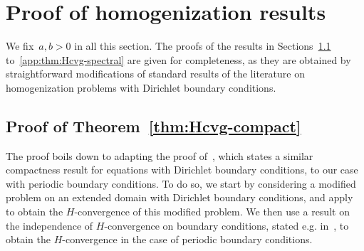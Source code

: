 \documentclass{article}
\begin{document}
\section{Proof of homogenization results}

We fix~$a,b>0$ in all this section. The proofs of the results in Sections~\ref{app:thm:Hcvg-compact} to~\ref{app:thm:Hcvg-spectral} are given for completeness, as they are obtained by straightforward modifications of standard results of the literature on homogenization problems with Dirichlet boundary conditions.

\subsection{Proof of Theorem~\ref{thm:Hcvg-compact}}
\label{app:thm:Hcvg-compact}

The proof boils down to adapting the proof of~\cite[Theorem~1.2.16]{allaire_homogeneisation}, which states a similar compactness result for equations with Dirichlet boundary conditions, to our case with periodic boundary conditions. To do so, we start by considering a modified problem on an extended domain with Dirichlet boundary conditions, and apply~\cite[Theorem 1.2.16]{allaire_homogeneisation} to obtain the $H$-convergence of this modified problem. We then use a result on the independence of $H$-convergence on boundary conditions, stated e.g. in~\cite[Proposition~1.2.19]{allaire_homogeneisation}, to obtain the $H$-convergence in the case of periodic boundary conditions.
\end{document}
